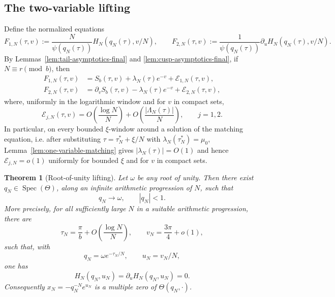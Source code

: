 \documentclass[11pt,a4paper,reqno]{amsart}
\newtheorem{theorem}{Theorem}[section]
\theoremstyle{remark}
\newcommand{\Spec}{\operatorname{Spec}}
\begin{document}
\subsection{The two-variable lifting}
Define the normalized equations
\begin{equation}\label{eq:normalized-FN}
        F_{1,N}(\tau,v):=\frac{N}{\psi(q_N(\tau))}H_N(q_N(\tau),v/N),
        \qquad
        F_{2,N}(\tau,v):=\frac{1}{\psi(q_N(\tau))}\partial_uH_N(q_N(\tau),v/N).
\end{equation}
By Lemmas~\ref{lem:tail-asymptotics-final} and \ref{lem:cusp-asymptotics-final}, if $N\equiv r\pmod b$, then
\begin{align}
        F_{1,N}(\tau,v)
        &=S_b(\tau,v)+\lambda_N(\tau)e^{-v}+\mathcal E_{1,N}(\tau,v),\label{eq:F1-asym}\\
        F_{2,N}(\tau,v)
        &=\partial_vS_b(\tau,v)-\lambda_N(\tau)e^{-v}+\mathcal E_{2,N}(\tau,v),\label{eq:F2-asym}
\end{align}
where, uniformly in the logarithmic window and for $v$ in compact sets,
\begin{equation}\label{eq:F-error-bound}
        \mathcal E_{j,N}(\tau,v)
        =O\!\left(\frac{\log N}{N}\right)
         +O\!\left(\frac{|\Lambda_N(\tau)|}{N}\right),
        \qquad j=1,2.
\end{equation}
In particular, on every bounded $\xi$-window around a solution of the matching equation, i.e. after substituting
$\tau=\tau_N^*+\xi/N$ with $\lambda_N(\tau_N^*)=\mu_0$, Lemma~\ref{lem:one-variable-matching} gives
$|\lambda_N(\tau)|=O(1)$ and hence $\mathcal E_{j,N}=o(1)$ uniformly for bounded $\xi$ and for $v$ in compact sets.

\begin{theorem}[Root-of-unity lifting]\label{thm:root-unity-lifting-final}
Let $\omega$ be any root of unity.  Then there exist $q_N\in\Spec(\Theta)$, along an infinite arithmetic progression of $N$, such that
\[
        q_N\to\omega,
        \qquad |q_N|<1.
\]
More precisely, for all sufficiently large $N$ in a suitable arithmetic progression, there are
\[
        \tau_N=\frac\pi b+O\left(\frac{\log N}{N}\right),
        \qquad
        v_N=\frac{3\pi}{4}+o(1),
\]
such that, with
\[
        q_N=\omega e^{-\tau_N/N},
        \qquad
        u_N=v_N/N,
\]
one has
\[
        H_N(q_N,u_N)=\partial_uH_N(q_N,u_N)=0.
\]
Consequently $x_N=-q_N^{-N}e^{u_N}$ is a multiple zero of $\Theta(q_N,\cdot)$.
\end{theorem}
\end{document}
